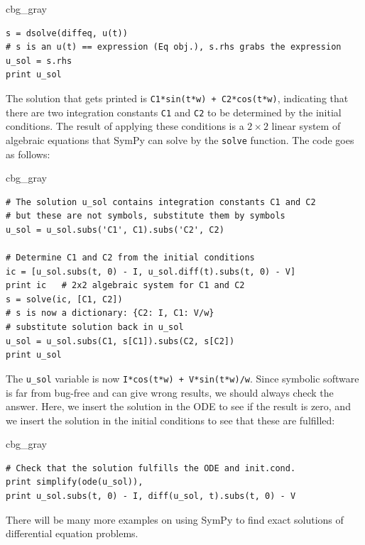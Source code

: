 \documentclass[graybox,envcountchap,sectrefs,final]{svmonodo}
\newenvironment{_cod_tight}[1]{
   \def\FrameCommand{\colorbox{#1}}
   \FrameRule0.6pt\MakeFramed {\FrameRestore}\vskip3mm}
   {\vskip0mm\endMakeFramed}
\newenvironment{cod}[1]{
\bgroup\rmfamily
\fboxsep=0mm\relax
\begin{_cod_tight}{#1}
\list{}{\parsep=-2mm\parskip=0mm\topsep=0pt\leftmargin=2mm
\rightmargin=2\leftmargin\leftmargin=4pt\relax}
\item\relax}
{\endlist\end{_cod_tight}\egroup}
\begin{document}
\begin{cod}{cbg_gray}\begin{Verbatim}[numbers=none,fontsize=\fontsize{9pt}{9pt},baselinestretch=0.95,xleftmargin=2mm]
s = dsolve(diffeq, u(t))
# s is an u(t) == expression (Eq obj.), s.rhs grabs the expression
u_sol = s.rhs
print u_sol
\end{Verbatim}
\end{cod}
\noindent
The solution that gets printed is \texttt{C1*sin(t*w) + C2*cos(t*w)}, indicating
that there are two integration constants \texttt{C1} and \texttt{C2} to be determined
by the initial conditions. The result of applying these conditions is
a $2\times 2$ linear system of algebraic equations that SymPy can solve
by the \texttt{solve} function. The code goes as follows:

\begin{cod}{cbg_gray}\begin{Verbatim}[numbers=none,fontsize=\fontsize{9pt}{9pt},baselinestretch=0.95,xleftmargin=2mm]
# The solution u_sol contains integration constants C1 and C2
# but these are not symbols, substitute them by symbols
u_sol = u_sol.subs('C1', C1).subs('C2', C2)

# Determine C1 and C2 from the initial conditions
ic = [u_sol.subs(t, 0) - I, u_sol.diff(t).subs(t, 0) - V]
print ic   # 2x2 algebraic system for C1 and C2
s = solve(ic, [C1, C2])
# s is now a dictionary: {C2: I, C1: V/w}
# substitute solution back in u_sol
u_sol = u_sol.subs(C1, s[C1]).subs(C2, s[C2])
print u_sol
\end{Verbatim}
\end{cod}
\noindent
The \Verb!u_sol! variable is now \texttt{I*cos(t*w) + V*sin(t*w)/w}.
Since symbolic software is far from bug-free and can give wrong results,
we should always check the answer. Here, we insert the solution in the ODE
to see if the result is zero, and we insert the solution in the initial
conditions to see that these are fulfilled:

\begin{cod}{cbg_gray}\begin{Verbatim}[numbers=none,fontsize=\fontsize{9pt}{9pt},baselinestretch=0.95,xleftmargin=2mm]
# Check that the solution fulfills the ODE and init.cond.
print simplify(ode(u_sol)),
print u_sol.subs(t, 0) - I, diff(u_sol, t).subs(t, 0) - V
\end{Verbatim}
\end{cod}
\noindent
There will be many more examples on using SymPy to find exact solutions
of differential equation problems.
\end{document}
